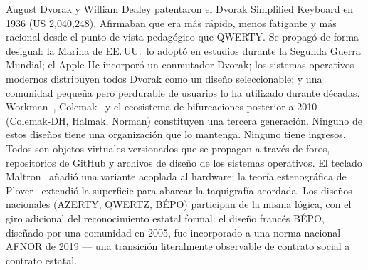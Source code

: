 \documentclass[10pt,letterpaper,twocolumn]{article}
\begin{document}
August Dvorak y William Dealey patentaron el Dvorak Simplified Keyboard en 1936 (US 2{,}040{,}248). Afirmaban que era más rápido, menos fatigante y más racional desde el punto de vista pedagógico que QWERTY. Se propagó de forma desigual: la Marina de EE.\,UU.\ lo adoptó en estudios durante la Segunda Guerra Mundial; el Apple IIc incorporó un conmutador Dvorak; los sistemas operativos modernos distribuyen todos Dvorak como un diseño seleccionable; y una comunidad pequeña pero perdurable de usuarios lo ha utilizado durante décadas. Workman~\citep{bucao2010workman}, Colemak~\citep{coleman2006colemak} y el ecosistema de bifurcaciones posterior a 2010 (Colemak-DH, Halmak, Norman) constituyen una tercera generación. Ninguno de estos diseños tiene una organización que lo mantenga. Ninguno tiene ingresos. Todos son objetos virtuales versionados que se propagan a través de foros, repositorios de GitHub y archivos de diseño de los sistemas operativos. El teclado Maltron~\citep{malt1977keyboard} añadió una variante acoplada al hardware; la teoría estenográfica de Plover~\citep{knight2010plover} extendió la superficie para abarcar la taquigrafía acordada. Los diseños nacionales (AZERTY, QWERTZ, BÉPO) participan de la misma lógica, con el giro adicional del reconocimiento estatal formal: el diseño francés BÉPO, diseñado por una comunidad en 2005, fue incorporado a una norma nacional AFNOR de 2019 --- una transición literalmente observable de contrato social a contrato estatal.
\end{document}
